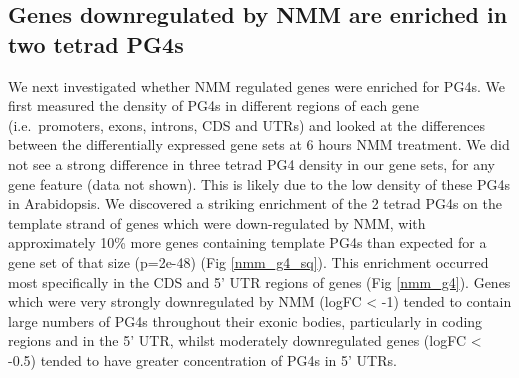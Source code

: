 \documentclass[12pt,a4paper,]{report}
\let\origfigure=\figure
\let\endorigfigure=\endfigure
\renewenvironment{figure}[1][2] {
    \expandafter\origfigure\expandafter[H]
} {
    \endorigfigure
}
\begin{document}
\begin{figure}[htbp]
\end{figure}

\newpage

\hypertarget{genes-downregulated-by-nmm-are-enriched-in-two-tetrad-pg4s}{%
\subsection{Genes downregulated by NMM are enriched in two tetrad
PG4s}\label{genes-downregulated-by-nmm-are-enriched-in-two-tetrad-pg4s}}

We next investigated whether NMM regulated genes were enriched for PG4s.
We first measured the density of PG4s in different regions of each gene
(i.e.~promoters, exons, introns, CDS and UTRs) and looked at the
differences between the differentially expressed gene sets at 6 hours
NMM treatment. We did not see a strong difference in three tetrad PG4
density in our gene sets, for any gene feature (data not shown). This is
likely due to the low density of these PG4s in Arabidopsis. We
discovered a striking enrichment of the 2 tetrad PG4s on the template
strand of genes which were down-regulated by NMM, with approximately
10\% more genes containing template PG4s than expected for a gene set of
that size (p=2e-48) (Fig \ref{nmm_g4_sq}). This enrichment occurred most
specifically in the CDS and 5' UTR regions of genes (Fig \ref{nmm_g4}).
Genes which were very strongly downregulated by NMM (logFC \textless{}
-1) tended to contain large numbers of PG4s throughout their exonic
bodies, particularly in coding regions and in the 5' UTR, whilst
moderately downregulated genes (logFC \textless{} -0.5) tended to have
greater concentration of PG4s in 5' UTRs.

\newpage
\end{document}
